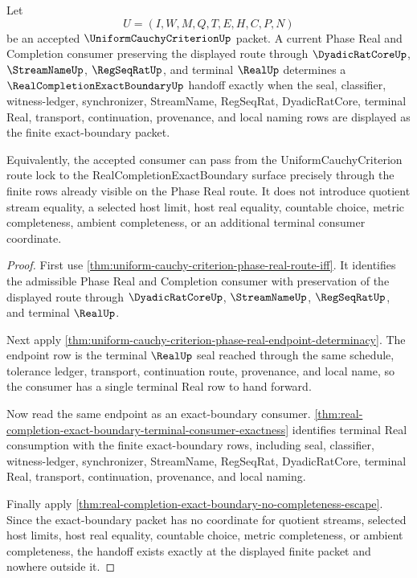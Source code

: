 \begin{theorem}
\label{thm:uniform-cauchy-criterion-real-completion-exact-boundary-handoff}
Let
$$
U=(I,W,M,Q,T,E,H,C,P,N)
$$
be an accepted $\UniformCauchyCriterionUp$ packet. A current Phase Real and Completion consumer preserving the displayed route through $\DyadicRatCoreUp$, $\StreamNameUp$, $\RegSeqRatUp$, and terminal $\RealUp$ determines a $\RealCompletionExactBoundaryUp$ handoff exactly when the seal, classifier, witness-ledger, synchronizer, StreamName, RegSeqRat, DyadicRatCore, terminal Real, transport, continuation, provenance, and local naming rows are displayed as the finite exact-boundary packet.

Equivalently, the accepted consumer can pass from the UniformCauchyCriterion route lock to the RealCompletionExactBoundary surface precisely through the finite rows already visible on the Phase Real route. It does not introduce quotient stream equality, a selected host limit, host real equality, countable choice, metric completeness, ambient completeness, or an additional terminal consumer coordinate.
\end{theorem}
\begin{proof}
First use \autoref{thm:uniform-cauchy-criterion-phase-real-route-iff}. It identifies the admissible Phase Real and Completion consumer with preservation of the displayed route through $\DyadicRatCoreUp$, $\StreamNameUp$, $\RegSeqRatUp$, and terminal $\RealUp$.

Next apply \autoref{thm:uniform-cauchy-criterion-phase-real-endpoint-determinacy}. The endpoint row is the terminal $\RealUp$ seal reached through the same schedule, tolerance ledger, transport, continuation route, provenance, and local name, so the consumer has a single terminal Real row to hand forward.

Now read the same endpoint as an exact-boundary consumer. \autoref{thm:real-completion-exact-boundary-terminal-consumer-exactness} identifies terminal Real consumption with the finite exact-boundary rows, including seal, classifier, witness-ledger, synchronizer, StreamName, RegSeqRat, DyadicRatCore, terminal Real, transport, continuation, provenance, and local naming.

Finally apply \autoref{thm:real-completion-exact-boundary-no-completeness-escape}. Since the exact-boundary packet has no coordinate for quotient streams, selected host limits, host real equality, countable choice, metric completeness, or ambient completeness, the handoff exists exactly at the displayed finite packet and nowhere outside it.
\end{proof}

